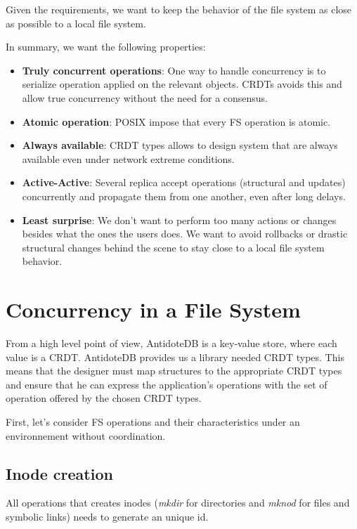 \documentclass[sigplan, 10pt]{acmart}
\begin{document}
Given the requirements, we want to keep the behavior of the file system as
close as possible to a local file system.

In summary, we want the following properties:

\begin{itemize}
    \item \textbf{Truly concurrent operations}: One way to
    handle concurrency is to serialize operation applied on the relevant objects.
    CRDTs avoids this and allow true concurrency without the need for a consensus.
    \item \textbf{Atomic operation}: POSIX impose that every FS operation
    is atomic.
    \item \textbf{Always available}: CRDT types allows to design system that
    are always available even under network extreme conditions.
    \item \textbf{Active-Active}: Several replica accept
    operations (structural and updates) concurrently and propagate them
    from one another, even after long delays.
    \item \textbf{Least surprise}: We don't want to perform too many actions
    or changes besides what the ones the users does. We want to
    avoid rollbacks or drastic structural changes behind the scene to stay close
    to a local file system behavior.
\end{itemize}

\section{Concurrency in a File System}

From a high level point of view, AntidoteDB is a key-value store, where each
value is a CRDT. AntidoteDB provides us a library needed CRDT types. This means
that the designer must map structures to the appropriate CRDT types and ensure
that he can express the application's operations with the set of operation
offered by the chosen CRDT types.

First, let's consider FS operations and their characteristics under an
environnement without coordination.

\subsection{Inode creation}

All operations that creates inodes
(\textit{mkdir} for directories and \textit{mknod} for files and symbolic links)
needs to generate an unique id.
\end{document}
